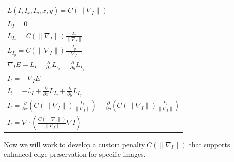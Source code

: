 \documentclass{article}
\begin{document}
  \begin{center}
    \begin{tabular}{l}
      \vspace{12pt}
      $L(I,I_{x},I_{y},x,y) = C(\| \nabla_{I} \|)$\\
      \vspace{12pt}
      $L_{I} = 0$\\
      \vspace{12pt}
      $L_{I_{x}} = \dot{C}(\| \nabla_{I} \|) \frac{I_{x}}{\| \nabla_{I} \|}$\\
      \vspace{12pt}
      $L_{I_{y}} = \dot{C}(\| \nabla_{I} \|) \frac{I_{y}}{\| \nabla_{I} \|}$\\
      \vspace{12pt}
      $\nabla_{I}E = L_{I} - \frac{\partial}{\partial x}L_{I_{x}} - \frac{\partial}{\partial y}L_{I_{y}}$\\
      \vspace{12pt}
      $I_{t} = -\nabla_{I}E$\\
      \vspace{12pt}
      $I_{t} = -L_{I} + \frac{\partial}{\partial x}L_{I_{x}} + \frac{\partial}{\partial y}L_{I_{y}}$\\
      \vspace{12pt}
      $I_{t} = \frac{\partial}{\partial x}(\dot{C}(\| \nabla_{I} \|) \frac{I_{x}}{\| \nabla_{I} \|}) + \frac{\partial}{\partial y}(\dot{C}(\| \nabla_{I} \|) \frac{I_{y}}{\| \nabla_{I} \|})$\\
      \vspace{12pt}
      $I_{t} = \nabla \cdot (\frac {\dot{C}(\| \nabla_{I} \|)}{\| \nabla_{I} \|} \nabla I)$
    \end{tabular}
  \end{center}

  \noindent
  Now we will work to develop a custom penalty $C(\| \nabla_{I}\|)$ that supports
  enhanced edge preservation for specific images.

  \newpage
\end{document}
